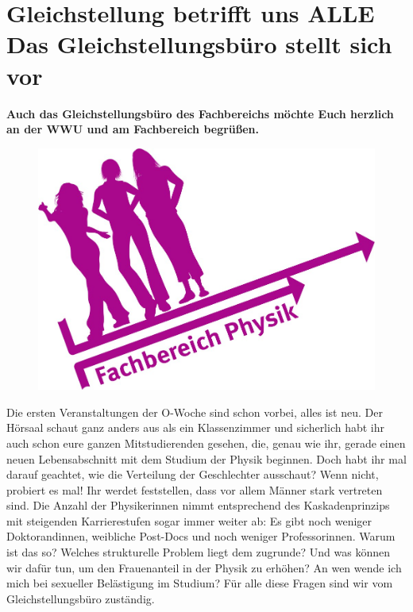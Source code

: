 \section[Gleichstellungsbüro am FB11]{Gleichstellung betrifft uns ALLE\\ Das Gleichstellungsbüro stellt sich vor}

\begin{multicols}{2}

\textbf{Auch das Gleichstellungsbüro des Fachbereichs möchte Euch herzlich an der WWU und am Fachbereich begrüßen.}

\begin{figure}
    \vspace*{-0.3cm}
    \includegraphics[width=\linewidth]{res/gst_buero.jpg}
\end{figure}

Die ersten Veranstaltungen der O-Woche sind schon vorbei, alles ist neu. Der Hörsaal schaut ganz anders aus als ein Klassenzimmer und sicherlich habt ihr auch schon eure ganzen Mitstudierenden gesehen, die, genau wie ihr, gerade einen neuen Lebensabschnitt mit dem Studium der Physik beginnen. Doch habt ihr mal darauf geachtet, wie die Verteilung der Geschlechter ausschaut? Wenn nicht, probiert es mal! Ihr werdet feststellen, dass vor allem Männer stark vertreten sind. Die Anzahl der Physikerinnen nimmt entsprechend des Kaskadenprinzips mit steigenden Karrierestufen sogar immer weiter ab: Es gibt noch weniger Doktorandinnen, weibliche Post-Docs und noch weniger Professorinnen. Warum ist das so? Welches strukturelle Problem liegt dem zugrunde? Und was können wir dafür tun, um den Frauenanteil in der Physik zu erhöhen? An wen wende ich mich bei sexueller Belästigung im Studium? Für alle diese Fragen sind wir vom Gleichstellungsbüro zuständig.


\end{multicols}
